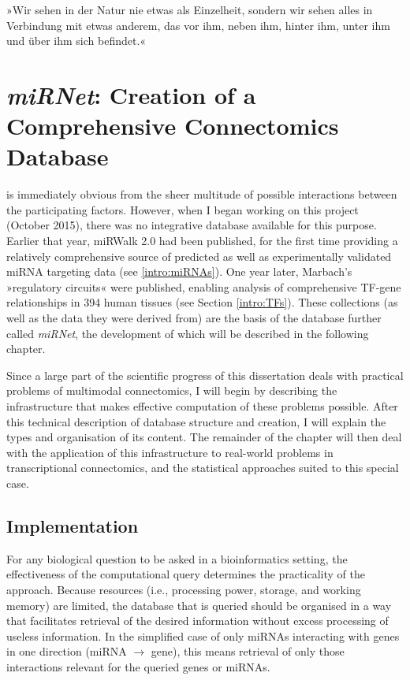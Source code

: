\begin{savequote}[75mm]
»Wir sehen in der Natur nie etwas als Einzelheit, sondern wir sehen alles in Verbindung mit etwas anderem, das vor ihm, neben ihm, hinter ihm, unter ihm und über ihm sich befindet.«
\end{savequote}

\chapter[miRNet: Creation of a Comprehensive Connectomics Database]{\textit{miRNet}: Creation of a\\Comprehensive Connectomics Database}
 is immediately obvious from the sheer multitude of possible interactions between the participating factors. However, when I began working on this project (October 2015), there was no integrative database available for this purpose. Earlier that year, miRWalk 2.0 had been published, for the first time providing a relatively comprehensive source of predicted as well as experimentally validated miRNA targeting data\cite{Dweep2015} (see \ref{intro:miRNAs}). One year later, Marbach's »regulatory circuits« were published\cite{Marbach2016}, enabling analysis of comprehensive TF-gene relationships in 394 human tissues (see Section \ref{intro:TFs}). These collections (as well as the data they were derived from) are the basis of the database further called \textit{miRNet}, the development of which will be described in the following chapter.

Since a large part of the scientific progress of this dissertation deals with practical problems of multimodal connectomics, I will begin by describing the infrastructure that makes effective computation of these problems possible. After this technical description of database structure and creation, I will explain the types and organisation of its content. The remainder of the chapter will then deal with the application of this infrastructure to real-world problems in transcriptional connectomics, and the statistical approaches suited to this special case.

\section{Implementation}
For any biological question to be asked in a bioinformatics setting, the effectiveness of the computational query determines the practicality of the approach. Because resources (i.e., processing power, storage, and working memory) are limited, the database that is queried should be organised in a way that facilitates retrieval of the desired information without excess processing of useless information. In the simplified case of only miRNAs interacting with genes in one direction (miRNA $\to$ gene), this means retrieval of only those interactions relevant for the queried genes or miRNAs. 

